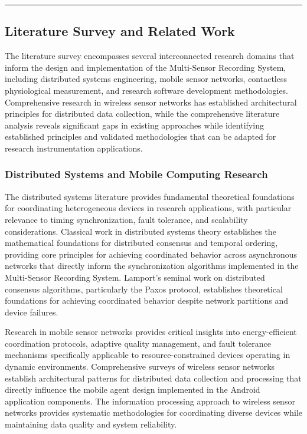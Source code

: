 \documentclass[12pt,a4paper]{report}
\begin{document}
\hrule

\subsection{Literature Survey and Related Work}

The literature survey encompasses several interconnected research domains that inform the design and implementation of
the Multi-Sensor Recording System, including distributed systems engineering, mobile sensor networks, contactless
physiological measurement, and research software development methodologies. Comprehensive research in wireless sensor
networks has established architectural principles for distributed data collection, while the comprehensive literature
analysis reveals significant gaps in existing approaches while identifying established principles and validated
methodologies that can be adapted for research instrumentation applications.

\subsubsection{Distributed Systems and Mobile Computing Research}

The distributed systems literature provides fundamental theoretical foundations for coordinating heterogeneous devices
in research applications, with particular relevance to timing synchronization, fault tolerance, and scalability
considerations. Classical work in distributed systems theory establishes the mathematical foundations for distributed
consensus and temporal ordering, providing core principles for achieving coordinated behavior across asynchronous
networks that directly inform the synchronization algorithms implemented in the Multi-Sensor Recording System. Lamport's
seminal work on distributed consensus algorithms, particularly the Paxos protocol, establishes theoretical foundations
for achieving coordinated behavior despite network partitions and device failures.

Research in mobile sensor networks provides critical insights into energy-efficient coordination protocols, adaptive
quality management, and fault tolerance mechanisms specifically applicable to resource-constrained devices operating in
dynamic environments. Comprehensive surveys of wireless sensor networks establish architectural patterns for distributed
data collection and processing that directly influence the mobile agent design implemented in the Android application
components. The information processing approach to wireless sensor networks provides systematic methodologies for
coordinating diverse devices while maintaining data quality and system reliability.
\end{document}
